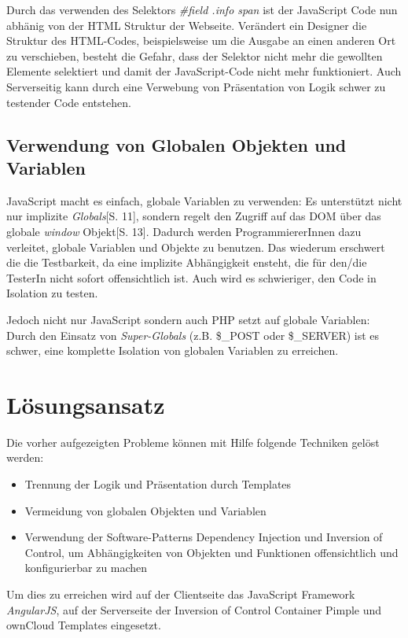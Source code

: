 \documentclass[a4paper,bibtotoc,oneside]{scrbook}
\begin{document}
Durch das verwenden des Selektors \emph{\#field .info span} ist der JavaScript Code nun abhänig von der HTML Struktur der Webseite. Verändert ein Designer  die Struktur des HTML-Codes, beispielsweise um die Ausgabe an einen anderen Ort zu verschieben, besteht die Gefahr, dass der Selektor nicht mehr die gewollten Elemente selektiert und damit der JavaScript-Code nicht mehr funktioniert. Auch Serverseitig kann durch eine Verwebung von Präsentation von Logik schwer zu testender Code entstehen.

\subsection{Verwendung von Globalen Objekten und Variablen}
JavaScript macht es einfach, globale Variablen zu verwenden: Es unterstützt nicht nur implizite \emph{Globals}\cite{js_patterns}[S. 11], sondern regelt den Zugriff auf das DOM über das globale \emph{window} Objekt\cite{js_patterns}[S. 13]. Dadurch werden ProgrammiererInnen dazu verleitet, globale Variablen und Objekte zu benutzen. Das wiederum erschwert die die Testbarkeit, da eine implizite Abhängigkeit ensteht, die für den/die TesterIn nicht sofort offensichtlich ist. Auch wird es schwieriger, den Code in Isolation zu testen.

Jedoch nicht nur JavaScript sondern auch PHP setzt auf globale Variablen: Durch den Einsatz von \emph{Super-Globals} (z.B. \$\_POST oder \$\_SERVER) ist es schwer, eine komplette Isolation von globalen Variablen zu erreichen.

\section{Lösungsansatz}
Die vorher aufgezeigten Probleme können mit Hilfe folgende Techniken gelöst werden:

\begin{itemize}
	\item Trennung der Logik und Präsentation durch Templates
	\item Vermeidung von globalen Objekten und Variablen
	\item Verwendung der Software-Patterns Dependency Injection und Inversion of Control, um Abhängigkeiten von Objekten und Funktionen offensichtlich und konfigurierbar zu machen
\end{itemize}

Um dies zu erreichen wird auf der Clientseite das JavaScript Framework \emph{AngularJS}\cite{angular}, auf der Serverseite der Inversion of Control Container Pimple\cite{pimple} und ownCloud Templates eingesetzt.
\end{document}
